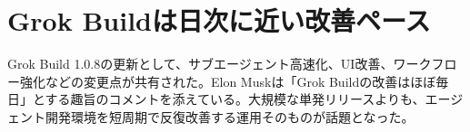 \section{Grok Buildは日次に近い改善ペース}
Grok Build 1.0.8の更新として、サブエージェント高速化、UI改善、ワークフロー強化などの変更点が共有された。Elon Muskは「Grok Buildの改善はほぼ毎日」とする趣旨のコメントを添えている。大規模な単発リリースよりも、エージェント開発環境を短周期で反復改善する運用そのものが話題となった。
